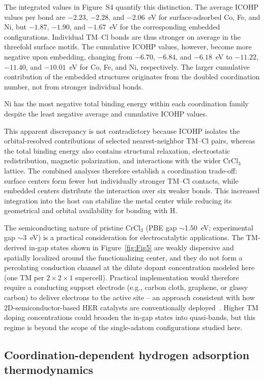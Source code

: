 \documentclass[journal=jacsat,manuscript=article]{achemso}
\begin{document}
The integrated values in Figure~S4 quantify this distinction. The average ICOHP values per bond are $-2.23$, $-2.28$, and $-2.06$~eV for surface-adsorbed Co, Fe, and Ni, but $-1.87$, $-1.90$, and $-1.67$~eV for the corresponding embedded configurations. Individual TM--Cl bonds are thus stronger on average in the threefold surface motifs. The cumulative ICOHP values, however, become more negative upon embedding, changing from $-6.70$, $-6.84$, and $-6.18$~eV to $-11.22$, $-11.40$, and $-10.01$~eV for Co, Fe, and Ni, respectively. The larger cumulative contribution of the embedded structures originates from the doubled coordination number, not from stronger individual bonds.

Ni has the most negative total binding energy within each coordination family despite the least negative average and cumulative ICOHP values.

This apparent discrepancy is not contradictory because ICOHP isolates the orbital-resolved contributions of selected nearest-neighbor TM--Cl pairs, whereas the total binding energy also contains structural relaxation, electrostatic redistribution, magnetic polarization, and interactions with the wider CrCl$_3$ lattice. The combined analyses therefore establish a coordination trade-off: surface centers form fewer but individually stronger TM--Cl contacts, while embedded centers distribute the interaction over six weaker bonds. This increased integration into the host can stabilize the metal center while reducing its geometrical and orbital availability for bonding with H.

The semiconducting nature of pristine CrCl$_3$ (PBE gap $\sim$1.50~eV; experimental gap $\sim$3~eV) is a practical consideration for electrocatalytic applications. The TM-derived in-gap states shown in Figure~\ref{fig:Fig5} are weakly dispersive and spatially localized around the functionalizing center, and they do not form a percolating conduction channel at the dilute dopant concentration modeled here (one TM per $2\times2\times1$ supercell). Practical implementation would therefore require a conducting support electrode (e.g., carbon cloth, graphene, or glassy carbon) to deliver electrons to the active site -- an approach consistent with how 2D-semiconductor-based HER catalysts are conventionally deployed~\cite{Ipaves2025,Liao2022}. Higher TM doping concentrations could broaden the in-gap states into quasi-bands, but this regime is beyond the scope of the single-adatom configurations studied here.

\subsection{Coordination-dependent hydrogen adsorption thermodynamics}
\end{document}
